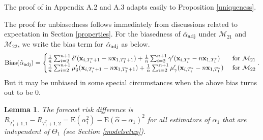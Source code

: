 \documentclass[11pt]{article}
\def\mbf#1{\mathbf{#1}} %
\def\mrm#1{\mathrm{#1}} %
\def\mc#1{\mathcal{#1}} %
\def\E#1{\mathrm{E}(#1)} %
\newtheorem{lem}{Lemma}
\theoremstyle{definition}
\newenvironment{proof-of-proposition}[1][{}]{\noindent{\bf
    Proof of Proposition {#1}}
  \hspace*{.5em}}{\qed\bigskip\\}
\begin{document}
\begin{proof-of-proposition}[\ref{uniqueness}]
  The proof of \citet{li2019statistical} in Appendix A.2 and A.3 adapts easily to Proposition \ref{uniqueness}.
\end{proof-of-proposition}


\begin{proof-of-proposition}[\ref{unbiased}] The proof for unbiasedness follows immediately from discussions related to expectation in Section \ref{properties}. For the biasedness of  $\hat{\alpha}_{\rm adj}$ under $\mc{M}_{21}$ and $\mc{M}_{22}$, we write the bias term for $\hat{\alpha}_{\rm adj}$ as below.
\begin{align*}
  \mrm{Bias}(\hat{\alpha}_{\rm adj}) = 
  \begin{cases}
       \frac{1}{n} \sum_{i=2}^{n+1} \delta'(\mbf{x}_{i, T_i^*+1}-n\mbf{x}_{1, T_1^*+1}) +  \frac{1}{n} \sum_{i=2}^{n+1} \gamma'(\mbf{x}_{i, T_i^*}-n\mbf{x}_{1, T_1^*}) & \text{ for } \mc{M}_{21}\\
    \frac{1}{n} \sum_{i=2}^{n+1} \mu_{\delta}'(\mbf{x}_{i, T_i^*+1}-n\mbf{x}_{1, T_1^*+1}) +  \frac{1}{n} \sum_{i=2}^{n+1} \mu_{\gamma}'(\mbf{x}_{i, T_i^*}-n\mbf{x}_{1, T_1^*}) & \text{ for }\mc{M}_{22}
  \end{cases}.
\end{align*}
But it may be unbiased in some special circumstances when the above bias turns out to be 0. \end{proof-of-proposition}

\begin{lem}
  \label{risklemma} The forecast risk difference is $R_{T_1^*+1,1}-R_{T_1^*+1,2}=\E{\alpha_1^2}-\E{\hat{\alpha}-\alpha_1}^2$ for all estimators of $\alpha_1$ that are independent of $\Theta_1$ (see Section \ref{modelsetup}).
\end{lem}
\end{document}
